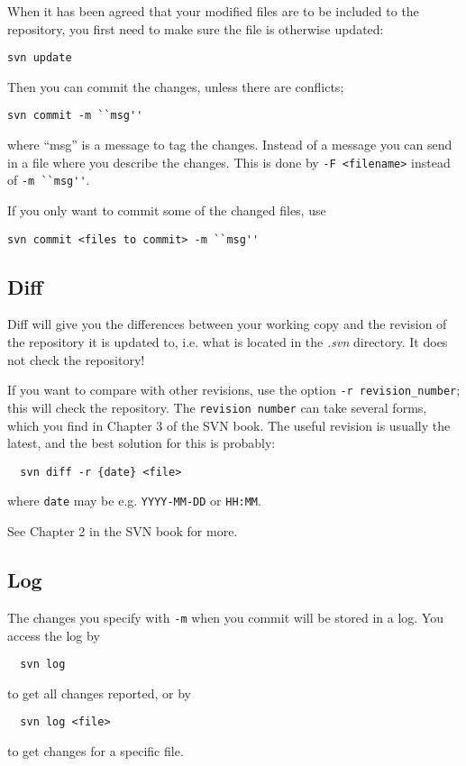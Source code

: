 \documentclass[10pt,a4paper,twocolumn]{article}
\begin{document}
When it has been agreed that your modified files are to be included to
the repository, you first need to make sure the file is otherwise
updated:
{\small
\begin{verbatim}
svn update
\end{verbatim}
}
Then you can commit the changes, unless there are conflicts;
{\small
\begin{verbatim}
svn commit -m ``msg''
\end{verbatim}
}
where ``msg'' is a message to tag the changes. Instead of a message
you can send in a file where you describe the changes. This is done by
\verb#-F <filename># instead of \verb#-m ``msg''#.

If you only want to commit some of the changed files, use
{\small
\begin{verbatim}
svn commit <files to commit> -m ``msg''
\end{verbatim}
}



\subsection{Diff}
Diff will give you the differences between your working copy and the
revision of the repository it is updated to, i.e. what is located in
the {\it .svn} directory. It does not check the repository!

If you want to compare with other revisions, use the option
\verb#-r revision_number#; this will check the repository. The
\verb#revision number# can take several forms, which you find in
Chapter 3 of the SVN book. The useful revision is usually the latest,
and the best solution for this is probably:
\begin{verbatim}
  svn diff -r {date} <file>
\end{verbatim}
where \verb#date# may be e.g. \verb#YYYY-MM-DD# or \verb#HH:MM#.

See Chapter 2 in the SVN book for more.


\subsection{Log}
The changes you specify with \verb#-m# when you commit will be stored
in a log. You access the log by
\begin{verbatim}
  svn log
\end{verbatim}
to get all changes reported, or by 
\begin{verbatim}
  svn log <file>
\end{verbatim}
to get changes for a specific file.
\end{document}
